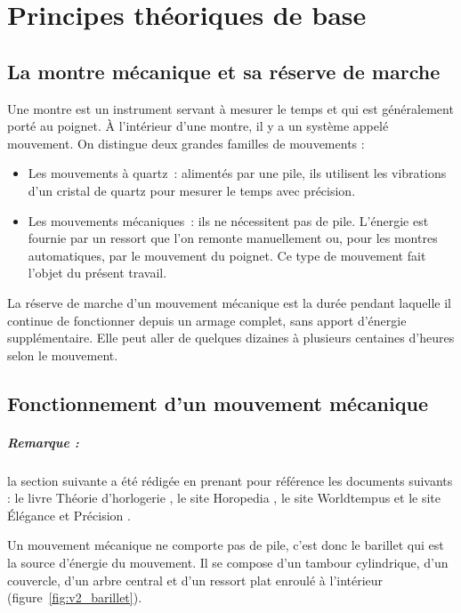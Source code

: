 \chapter{Principes théoriques de base}
\label{chap:principes-theoriques}

\section{La montre mécanique et sa réserve de marche}

Une montre est un instrument servant à mesurer le temps et qui est généralement porté au poignet. 
À l'intérieur d'une montre, il y a un système appelé mouvement. 
On distingue deux grandes familles de mouvements :

\begin{itemize}
  \item Les mouvements à quartz~: alimentés par une pile, ils utilisent les vibrations d'un cristal de quartz pour mesurer le temps avec précision.
  \item Les mouvements mécaniques~: ils ne nécessitent pas de pile. L'énergie est fournie par un ressort que l'on remonte manuellement ou, pour les montres automatiques, par le mouvement du poignet. Ce type de mouvement fait l'objet du présent travail.
\end{itemize}

La réserve de marche d'un mouvement mécanique est la durée pendant laquelle il continue de fonctionner depuis un armage complet, sans apport d'énergie supplémentaire. 
Elle peut aller de quelques dizaines à plusieurs centaines d'heures selon le mouvement.

\section{Fonctionnement d'un mouvement mécanique}

\paragraph{Remarque :} la section suivante a été rédigée en prenant pour référence les documents suivants : le livre \og Théorie d'horlogerie \fg{} \cite{theorie_horlogerie}, le site \og Horopedia \fg{} \cite{Horopedia_rochet}, le site \og Worldtempus \fg{} \cite{Worldtempus} et le site \og Élégance et Précision \fg{} \cite{Elegance_precision}.

Un mouvement mécanique ne comporte pas de pile, c'est donc le barillet qui est la source d'énergie du mouvement. 
Il se compose d'un tambour cylindrique, d'un couvercle, d'un arbre central et d'un ressort plat enroulé à l'intérieur (figure~\ref{fig:v2_barillet}).

